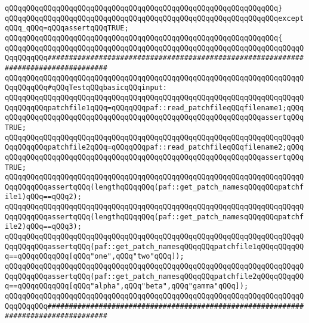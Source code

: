 \verb|qQQqqQQqqQQqqQQqqQQqqQQqqQQqqQQqqQQqqQQqqQQqqQQqqQQqqQQqqQQqqQQq}|\newline
\verb|qQQqqQQqqQQqqQQqqQQqqQQqqQQqqQQqqQQqqQQqqQQqqQQqqQQqqQQqqQQqqQQqexceptqQQq_qQQq=qQQqassertqQQqTRUE;|\newline
\newline
\verb|qQQqqQQqqQQqqQQqqQQqqQQqqQQqqQQqqQQqqQQqqQQqqQQqqQQqqQQqqQQqqQQq{|\newline
\verb|qQQqqQQqqQQqqQQqqQQqqQQqqQQqqQQqqQQqqQQqqQQqqQQqqQQqqQQqqQQqqQQqqQQqqQQqqQQqqQQq####################################################################################|\newline
\verb|qQQqqQQqqQQqqQQqqQQqqQQqqQQqqQQqqQQqqQQqqQQqqQQqqQQqqQQqqQQqqQQqqQQqqQQqqQQqqQQq#qQQqTestqQQqbasicqQQqinput:|\newline
\newline
\verb|qQQqqQQqqQQqqQQqqQQqqQQqqQQqqQQqqQQqqQQqqQQqqQQqqQQqqQQqqQQqqQQqqQQqqQQqqQQqqQQqpatchfile1qQQq=qQQqqQQqpaf::read_patchfileqQQqfilename1;qQQqqQQqqQQqqQQqqQQqqQQqqQQqqQQqqQQqqQQqqQQqqQQqqQQqqQQqqQQqqQQqassertqQQqTRUE;|\newline
\verb|qQQqqQQqqQQqqQQqqQQqqQQqqQQqqQQqqQQqqQQqqQQqqQQqqQQqqQQqqQQqqQQqqQQqqQQqqQQqqQQqpatchfile2qQQq=qQQqqQQqpaf::read_patchfileqQQqfilename2;qQQqqQQqqQQqqQQqqQQqqQQqqQQqqQQqqQQqqQQqqQQqqQQqqQQqqQQqqQQqqQQqassertqQQqTRUE;|\newline
\newline
\verb|qQQqqQQqqQQqqQQqqQQqqQQqqQQqqQQqqQQqqQQqqQQqqQQqqQQqqQQqqQQqqQQqqQQqqQQqqQQqqQQqassertqQQq(lengthqQQqqQQq(paf::get_patch_namesqQQqqQQqpatchfile1)qQQq==qQQq2);|\newline
\verb|qQQqqQQqqQQqqQQqqQQqqQQqqQQqqQQqqQQqqQQqqQQqqQQqqQQqqQQqqQQqqQQqqQQqqQQqqQQqqQQqassertqQQq(lengthqQQqqQQq(paf::get_patch_namesqQQqqQQqpatchfile2)qQQq==qQQq3);|\newline
\newline
\verb|qQQqqQQqqQQqqQQqqQQqqQQqqQQqqQQqqQQqqQQqqQQqqQQqqQQqqQQqqQQqqQQqqQQqqQQqqQQqqQQqassertqQQq(paf::get_patch_namesqQQqqQQqpatchfile1qQQqqQQqqQQq==qQQqqQQqqQQq[qQQq"one",qQQq"two"qQQq]);|\newline
\verb|qQQqqQQqqQQqqQQqqQQqqQQqqQQqqQQqqQQqqQQqqQQqqQQqqQQqqQQqqQQqqQQqqQQqqQQqqQQqqQQqassertqQQq(paf::get_patch_namesqQQqqQQqpatchfile2qQQqqQQqqQQq==qQQqqQQqqQQq[qQQq"alpha",qQQq"beta",qQQq"gamma"qQQq]);|\newline
\newline
\newline
\newline
\verb|qQQqqQQqqQQqqQQqqQQqqQQqqQQqqQQqqQQqqQQqqQQqqQQqqQQqqQQqqQQqqQQqqQQqqQQqqQQqqQQq####################################################################################|\newline
